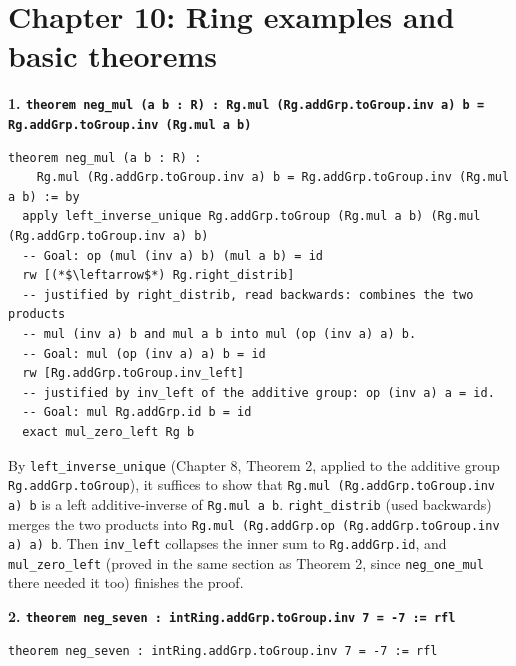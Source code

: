 \section{Chapter 10: Ring examples and basic theorems}\label{sec:15-appendix-solutions:10-chapter-10:1}

\textbf{1. \texttt{theorem neg\_\allowbreak{}mul (a b : R) : Rg.mul (Rg.addGrp.toGroup.inv a) b = Rg.addGrp.toGroup.inv (Rg.mul a b)}}

\begin{lstlisting}
theorem neg_mul (a b : R) :
    Rg.mul (Rg.addGrp.toGroup.inv a) b = Rg.addGrp.toGroup.inv (Rg.mul a b) := by
  apply left_inverse_unique Rg.addGrp.toGroup (Rg.mul a b) (Rg.mul (Rg.addGrp.toGroup.inv a) b)
  -- Goal: op (mul (inv a) b) (mul a b) = id
  rw [(*$\leftarrow$*) Rg.right_distrib]
  -- justified by right_distrib, read backwards: combines the two products
  -- mul (inv a) b and mul a b into mul (op (inv a) a) b.
  -- Goal: mul (op (inv a) a) b = id
  rw [Rg.addGrp.toGroup.inv_left]
  -- justified by inv_left of the additive group: op (inv a) a = id.
  -- Goal: mul Rg.addGrp.id b = id
  exact mul_zero_left Rg b
\end{lstlisting}

By \texttt{left\_\allowbreak{}inverse\_\allowbreak{}unique} (Chapter 8, Theorem 2, applied to the additive group \texttt{Rg.addGrp.toGroup}), it suffices to show that \texttt{Rg.mul (Rg.addGrp.toGroup.inv a) b} is a left additive-inverse of \texttt{Rg.mul a b}. \texttt{right\_\allowbreak{}distrib} (used backwards) merges the two products into \texttt{Rg.mul (Rg.addGrp.op (Rg.addGrp.toGroup.inv a) a) b}. Then \texttt{inv\_\allowbreak{}left} collapses the inner sum to \texttt{Rg.addGrp.id}, and \texttt{mul\_\allowbreak{}zero\_\allowbreak{}left} (proved in the same section as Theorem 2, since \texttt{neg\_\allowbreak{}one\_\allowbreak{}mul} there needed it too) finishes the proof.

\textbf{2. \texttt{theorem neg\_\allowbreak{}seven : intRing.addGrp.toGroup.inv 7 = -\allowbreak{}7 := rfl}}

\begin{lstlisting}
theorem neg_seven : intRing.addGrp.toGroup.inv 7 = -7 := rfl
\end{lstlisting}

